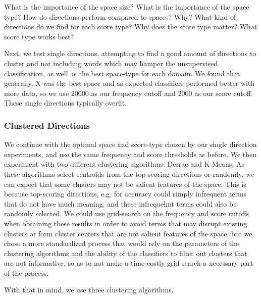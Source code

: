 What is the importance of the space size?
What is the importance of the space type?
How do directions perform compared to spaces? Why?
What kind of directions do we find for each score type?
Why does the score type matter? What score type works best?


Next, we test single directions, attempting to find a good amount of directions to cluster and not including words which may hamper the unsupervised classification, as well as the best space-type for each domain. We found that generally, X was the best space and as expected classifiers performed better with more data, so we use 20000 as our frequency cutoff and 2000 as our score cutoff. These single directions typically overfit.


\subsubsection{Clustered Directions}
We continue with the optimal space and score-type chosen by our single direction experiments, and use the same frequency and score thresholds as before. We then experiment with two different clustering algorithms: Derrac and K-Means. As these algorithms select centroids from the top-scoring directions or randomly, we can expect that some clusters may not be salient features of the space. This is because top-scoring directions, e.g. for accuracy could simply infrequent terms that do not have much meaning, and these infrequehnt terms could also be randomly selected. We could use grid-search on the frequency and score cutoffs when obtaining these results in order to avoid terms that may disrupt existing clusters or form cluster centers that are not salient features of the space, but we chose a more standardized process that would rely on the parameters of the clustering algorithms and the ability of the classifiers to filter out clusters that are not informative, so as to not make a time-costly grid search a necessary part of the process.

With that in mind, we use three clustering algorithms.


